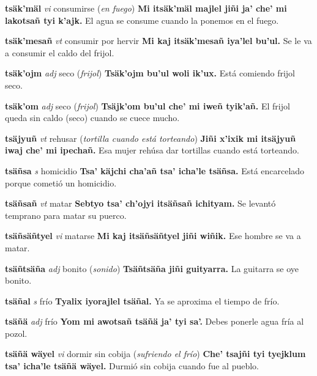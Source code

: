\documentclass[10pt]{scrbook}
\newcommand{\entry}[1]{\textbf{#1}}
\newcommand{\partofspeech}[1]{\textit{#1}}
\newcommand{\spanishtranslation}[1]{#1}
\newcommand{\clarification}[1]{(\textit{#1})}
\newcommand{\cholexample}[1]{\textbf{#1}}
\newcommand{\exampletranslation}[1]{#1}
\begin{document}
\begin{multicols}{2}
\entry{tsäk'mäl}
\partofspeech{vi}
\spanishtranslation{consumirse}
\clarification{en fuego}
\cholexample{Mi itsäk'mäl majlel jiñi ja' che' mi lakotsañ tyi k'ajk.}
\exampletranslation{El agua se consume cuando la ponemos en el fuego.}

\entry{tsäk'mesañ}
\partofspeech{vt}
\spanishtranslation{consumir por hervir}
\cholexample{Mi kaj itsäk'mesañ iya'lel bu'ul.}
\exampletranslation{Se le va a consumir el caldo del frijol.}

\entry{tsäk'ojm}
\partofspeech{adj}
\spanishtranslation{seco}
\clarification{frijol}
\cholexample{Tsäk'ojm bu'ul woli ik'ux.}
\exampletranslation{Está comiendo frijol seco.}

\entry{tsäk'om}
\partofspeech{adj}
\spanishtranslation{seco}
\clarification{frijol}
\cholexample{Tsäjk'om bu'ul che' mi iweñ tyik'añ.}
\exampletranslation{El frijol queda sin caldo (seco) cuando se cuece mucho.}

\entry{tsäjyuñ}
\partofspeech{vt}
\spanishtranslation{rehusar}
\clarification{tortilla cuando está torteando}
\cholexample{Jiñi x'ixik mi itsäjyuñ iwaj che' mi ipechañ.}
\exampletranslation{Esa mujer rehúsa dar tortillas cuando está torteando.}

\entry{tsäñsa}
\partofspeech{s}
\spanishtranslation{homicidio}
\cholexample{Tsa' käjchi cha'añ tsa' icha'le tsäñsa.}
\exampletranslation{Está encarcelado porque cometió un homicidio.}

\entry{tsäñsañ}
\partofspeech{vt}
\spanishtranslation{matar}
\cholexample{Sebtyo tsa' ch'ojyi itsäñsañ ichityam.}
\exampletranslation{Se levantó temprano para matar su puerco.}

\entry{tsäñsäñtyel}
\partofspeech{vi}
\spanishtranslation{matarse}
\cholexample{Mi kaj itsäñsäñtyel jiñi wiñik.}
\exampletranslation{Ese hombre se va a matar.}

\entry{tsäñtsäña}
\partofspeech{adj}
\spanishtranslation{bonito}
\clarification{sonido}
\cholexample{Tsäñtsäña jiñi guityarra.}
\exampletranslation{La guitarra se oye bonito.}

\entry{tsäñal}
\partofspeech{s}
\spanishtranslation{frío}
\cholexample{Tyalix iyorajlel tsäñal.}
\exampletranslation{Ya se aproxima el tiempo de frío.}

\entry{tsäñä}
\partofspeech{adj}
\spanishtranslation{frío}
\cholexample{Yom mi awotsañ tsäñä ja' tyi sa'.}
\exampletranslation{Debes ponerle agua fría al pozol.}

\entry{tsäñä wäyel}
\partofspeech{vi}
\spanishtranslation{dormir sin cobija}
\clarification{sufriendo el frío}
\cholexample{Che' tsajñi tyi tyejklum tsa' icha'le tsäñä wäyel.}
\exampletranslation{Durmió sin cobija cuando fue al pueblo.}


\end{multicols}
\end{document}
